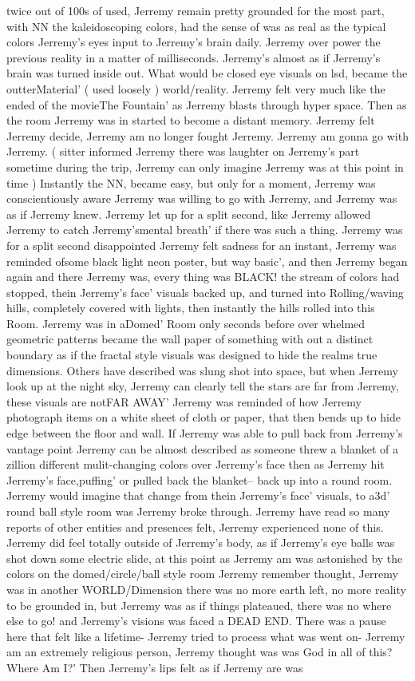 \documentclass[12pt]{book}
\begin{document}
twice out of 100s of used, Jerremy remain pretty grounded for the most part, with NN the kaleidoscoping colors, had the sense of was as real as the typical colors Jerremy's eyes input to Jerremy's brain daily. Jerremy over power the previous reality in a matter of milliseconds. Jerremy's almost as if Jerremy's brain was turned inside out. What would be closed eye visuals on lsd, became the outterMaterial' ( used loosely ) world/reality. Jerremy felt very much like the ended of the movieThe Fountain' as Jerremy blasts through hyper space. Then as the room Jerremy was in started to become a distant memory. Jerremy felt Jerremy decide, Jerremy am no longer fought Jerremy. Jerremy am gonna go with Jerremy. ( sitter informed Jerremy there was laughter on Jerremy's part sometime during the trip, Jerremy can only imagine Jerremy was at this point in time ) Instantly the NN, became easy, but only for a moment, Jerremy was conscientiously aware Jerremy was willing to go with Jerremy, and Jerremy was as if Jerremy knew. Jerremy let up for a split second, like Jerremy allowed Jerremy to catch Jerremy'smental breath' if there was such a thing. Jerremy was for a split second disappointed Jerremy felt sadness for an instant, Jerremy was reminded ofsome black light neon poster, but way basic', and then Jerremy began again and there Jerremy was, every thing was BLACK! the stream of colors had stopped, thein Jerremy's face' visuals backed up, and turned into Rolling/waving hills, completely covered with lights, then instantly the hills rolled into this Room. Jerremy was in aDomed' Room only seconds before over whelmed geometric patterns became the wall paper of something with out a distinct boundary as if the fractal style visuals was designed to hide the realms true dimensions. Others have described was slung shot into space, but when Jerremy look up at the night sky, Jerremy can clearly tell the stars are far from Jerremy, these visuals are notFAR AWAY' Jerremy was reminded of how Jerremy photograph items on a white sheet of cloth or paper, that then bends up to hide edge between the floor and wall. If Jerremy was able to pull back from Jerremy's vantage point Jerremy can be almost described as someone threw a blanket of a zillion different mulit-changing colors over Jerremy's face then as Jerremy hit Jerremy's face,puffing' or pulled back the blanket-- back up into a round room. Jerremy would imagine that change from thein Jerremy's face' visuals, to a3d' round ball style room was Jerremy broke through. Jerremy have read so many reports of other entities and presences felt, Jerremy experienced none of this. Jerremy did feel totally outside of Jerremy's body, as if Jerremy's eye balls was shot down some electric slide, at this point as Jerremy am was astonished by the colors on the domed/circle/ball style room Jerremy remember thought, Jerremy was in another WORLD/Dimension there was no more earth left, no more reality to be grounded in, but Jerremy was as if things plateaued, there was no where else to go! and Jerremy's visions was faced a DEAD END. There was a pause here that felt like a lifetime- Jerremy tried to process what was went on- Jerremy am an extremely religious person, Jerremy thought was was God in all of this? Where Am I?' Then Jerremy's lips felt as if Jerremy are was 
\end{document}
